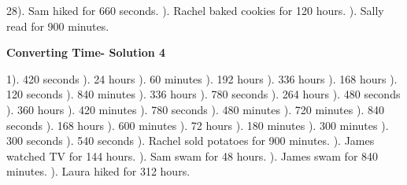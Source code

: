 \documentclass{article}%
\begin{document}
28). Sam hiked for 660 seconds.%
). Rachel baked cookies for 120 hours.%
). Sally read for 900 minutes.%
\newline%
\newpage%
\large%
\begin{center}%
\textbf{Converting Time- Solution 4}%
\newline%
\end{center} \normalsize%
1). 420 seconds%
). 24 hours%
). 60 minutes%
). 192 hours%
). 336 hours%
). 168 hours%
). 120 seconds%
). 840 minutes%
). 336 hours%
). 780 seconds%
). 264 hours%
). 480 seconds%
). 360 hours%
). 420 minutes%
). 780 seconds%
). 480 minutes%
). 720 minutes%
). 840 seconds%
). 168 hours%
). 600 minutes%
). 72 hours%
). 180 minutes%
). 300 minutes%
). 300 seconds%
). 540 seconds%
). Rachel sold potatoes for 900 minutes.%
). James watched TV for 144 hours.%
). Sam swam for 48 hours.%
). James swam for 840 minutes.%
). Laura hiked for 312 hours.%
\newline%
\newpage%
\end{document}
